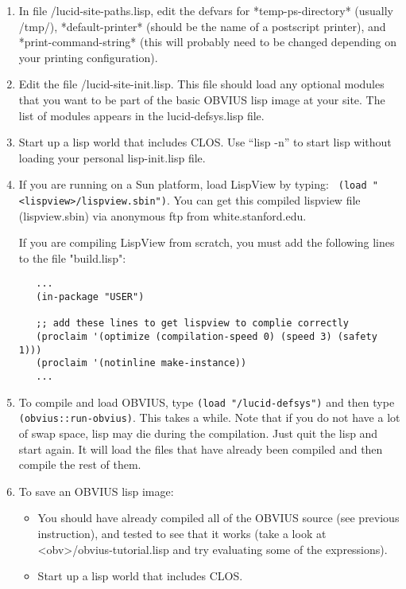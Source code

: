 \begin{enumerate}
\item  
In file /lucid-site-paths.lisp, edit the defvars for
*temp-ps-directory* (usually /tmp/), *default-printer* (should be the
name of a postscript printer), and *print-command-string* (this will
probably need to be changed depending on your printing configuration).

\item	
Edit the file /lucid-site-init.lisp.  This file should load
any optional modules that you want to be part of the basic OBVIUS lisp
image at your site.  The list of modules appears in the
lucid-defsys.lisp file.

\item 
Start up a lisp world that includes CLOS.  Use ``lisp -n'' to start
lisp without loading your personal lisp-init.lisp file.

\item
If you are running on a Sun platform, load LispView by typing: {\tt
(load "<lispview>/lispview.sbin")}.  You can get this compiled
lispview file (lispview.sbin) via anonymous ftp from
white.stanford.edu.

If you are compiling LispView from scratch, you must add the following
lines to the file "build.lisp":
\begin{verbatim}
   ...
   (in-package "USER")

   ;; add these lines to get lispview to complie correctly
   (proclaim '(optimize (compilation-speed 0) (speed 3) (safety 1)))
   (proclaim '(notinline make-instance))
   ...
\end{verbatim}

\item 
To compile and load OBVIUS, type {\tt (load
"/lucid-defsys")} and then type {\tt (obvius::run-obvius)}.
This takes a while.  Note that if you do not have a lot of swap space,
lisp may die during the compilation.  Just quit the lisp and start
again.  It will load the files that have already been compiled and
then compile the rest of them.

\item To save an OBVIUS lisp image:
\begin{itemize}
\item 
You should have already compiled all of the OBVIUS source (see
previous instruction), and tested to see that it works (take a look at
<obv>/obvius-tutorial.lisp and try evaluating some of the expressions).

\item Start up a lisp world that includes CLOS.


\end{itemize}
\end{enumerate}

